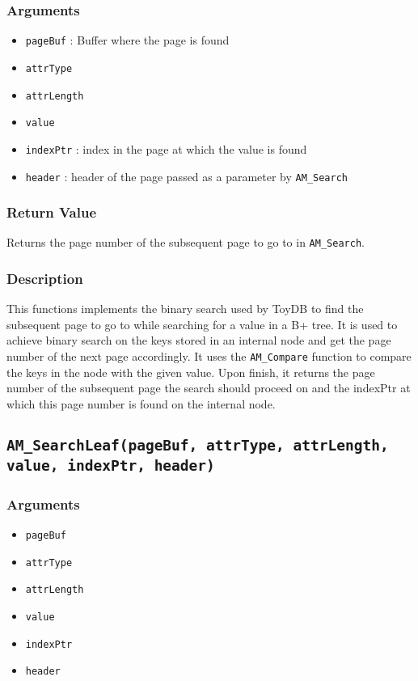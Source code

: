 \documentclass[a4paper, 12pt]{article}
\begin{document}
\subsubsection{Arguments}
\begin{itemize}
	\item{\texttt{pageBuf} : Buffer where the page is found}
	\item{\texttt{attrType}}
	\item{\texttt{attrLength}}
	\item{\texttt{value}}
	\item{\texttt{indexPtr} : index in the page at which the value is found}
	\item{\texttt{header} : header of the page passed as a parameter by \texttt{AM\_Search}}
\end{itemize}
\subsubsection{Return Value}
Returns the page number of the subsequent page to go to in \texttt{AM\_Search}.
\subsubsection{Description}
This functions implements the binary search used by ToyDB to find the subsequent page to go to while searching for a value in a B+ tree. It is used to achieve binary search on the keys stored in an internal node and get the page number of the next page accordingly. It uses the \texttt{AM\_Compare} function to compare the keys in the node with the given value. Upon finish, it returns the page number of the subsequent page the search should proceed on and the indexPtr at which this page number is found on the internal node.

\subsection{\texttt{AM\_SearchLeaf(pageBuf, attrType, attrLength, value, indexPtr, header)}}
\subsubsection{Arguments}
\begin{itemize}
	\item{\texttt{pageBuf}}
	\item{\texttt{attrType}}
	\item{\texttt{attrLength}}
	\item{\texttt{value}}
	\item{\texttt{indexPtr}}
	\item{\texttt{header}}
\end{itemize}
\end{document}

